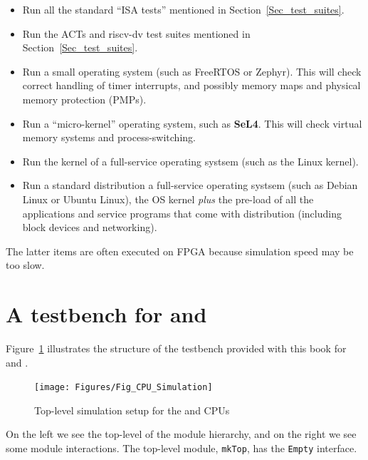 \begin{itemize}
 \item Run all the standard ``ISA tests'' mentioned in Section~\ref{Sec_test_suites}.

 \item Run the ACTs and riscv-dv test suites mentioned in Section~\ref{Sec_test_suites}.

 \item Run a small operating system (such as FreeRTOS or Zephyr).
       This will check correct handling of timer interrupts, and
       possibly memory maps and physical memory protection (PMPs).

 \item Run a ``micro-kernel'' operating system, such as {\bf SeL4}.
       This will check virtual memory systems and process-switching.

 \item Run the kernel of a full-service operating systsem (such as the Linux kernel).

 \item Run a standard distribution a full-service operating systsem
       (such as Debian Linux or Ubuntu Linux), {\ie} the OS kernel
       \emph{plus} the pre-load of all the applications and service
       programs that come with distribution (including block devices
       and networking).

\end{itemize}

The latter items are often executed on FPGA because simulation speed may be too slow.


\section{A testbench for {\DRUM} and {\FIFE}}

Figure~\ref{Fig_CPU_Simulation} illustrates the structure of the
testbench provided with this book for {\DRUM} and {\FIFE}.
\begin{figure}[htbp]
  \centerline{\texttt{[image: Figures/Fig\_CPU\_Simulation]}}
  \caption{\label{Fig_CPU_Simulation}
           Top-level simulation setup for the {\DRUM} and {\FIFE} CPUs}
\end{figure}
On the left we see the top-level of the module hierarchy, and on the
right we see some module interactions.  The top-level module,
\verb|mkTop|, has the \verb|Empty| interface.

